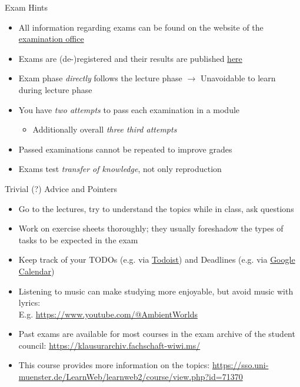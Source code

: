 \documentclass{ercisbeamer}
\begin{document}
\begin{frame}{Exam Hints}
    \begin{itemize}
        \item All information regarding exams can be found on the website of the \href{https://www.wiwi.uni-muenster.de/pam/en/examinations/schedule-examination-offer-examination-rooms}{examination office}
        \item Exams are (de-)registered and their results are published \href{https://pam-portal.uni-muenster.de/}{here}
        \item Exam phase \emph{directly} follows the lecture phase $\rightarrow$ Unavoidable to learn during lecture phase
        \item You have \emph{two attempts} to pass each examination in a module
        \begin{itemize}
            \item Additionally overall \emph{three third attempts}
        \end{itemize}
        \item Passed examinations cannot be repeated to improve grades
        \item Exams test \emph{transfer of knowledge}, not only reproduction
    \end{itemize}
\end{frame}

\begin{frame}{Trivial (?) Advice and Pointers}
    \begin{itemize}
        \item Go to the lectures, try to understand the topics while in class, ask questions
        \item Work on exercise sheets thoroughly; they usually foreshadow the types of tasks to be expected in the exam
        \item Keep track of your TODOs (e.g. via \href{https://todoist.com/}{Todoist}) and Deadlines (e.g. via \href{https://workspace.google.com/products/calendar/}{Google Calendar})
        \item Listening to music can make studying more enjoyable, but avoid music with lyrics: \\ E.g. \url{https://www.youtube.com/@AmbientWorlds}
        \item Past exams are available for most courses in the exam archive of the student council: \url{https://klausurarchiv.fachschaft-wiwi.ms/}
        \item This course  provides more information on the topics: \url{https://sso.uni-muenster.de/LearnWeb/learnweb2/course/view.php?id=71370}
    \end{itemize}
\end{frame}
\end{document}
